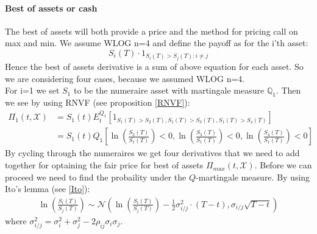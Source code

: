 \paragraph{Best of assets or cash}
The best of assets will both provide a price and the method for pricing call on max and min. We assume WLOG n=4 and define the payoff as for the i'th asset:
$$S_i(T) \cdot 1_{S_i(T)>S_j(T): i\neq j}$$
Hence the best of assets derivative is a sum of above equation for each asset. So we are considering four cases, because we assumed WLOG n=4. \\

For i=1 we set $S_1$ to be the numeraire asset with martingale measure $\mathbb{Q}_1$. Then we see by using RNVF (see proposition \ref{RNVF}):
\begin{equation}
\begin{split}
\Pi_1(t, \mathcal{X})&=S_1(t)E_t^{Q_1}[1_{S_1(T)>S_2(T), S_1(T)>S_3(T), S_1(T)>S_4(T)}]\\
&=S_1(t) Q_1[\ln(\frac{S_2(T)}{S_1(T)})<0, \ln(\frac{S_3(T)}{S_1(T)})<0, \ln(\frac{S_4(T)}{S_1(T)})<0]
\end{split}
\end{equation}
By cycling through the numeraires we get four derivatives that we need to add together for optaining the fair price for best of assets $\Pi_{max}(t,\mathcal{X})$. Before we can proceed we need to find the probaility under the $Q$-martingale measure. By using Ito's lemma (see \ref{Ito}):
\begin{align*}
\ln(\frac{S_i(T)}{S_j(T)})\sim \mathcal{N}(\ln(\frac{S_i(T)}{S_j(T)}) - \frac{1}{2}\sigma_{i/j}^2 \cdot (T-t), \sigma_{i/j}\sqrt{T-t})
\end{align*}
where $\sigma_{i/j}^2=\sigma_i^2+\sigma_j^2-2\rho_{ij}\sigma_i \sigma_j$.\\

